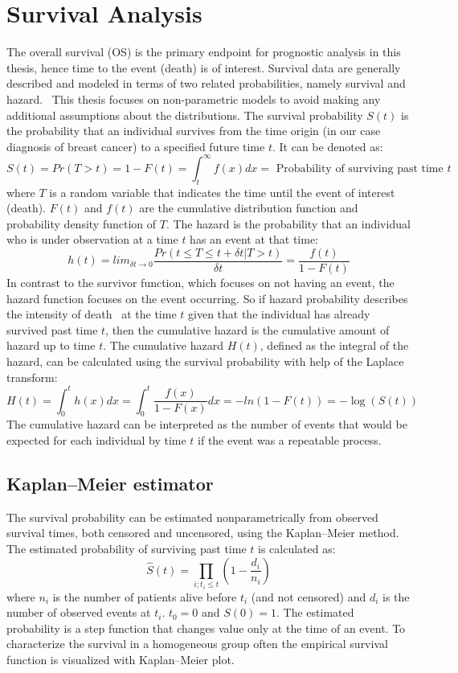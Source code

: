 \section{Survival Analysis}
The overall survival (OS) is the primary endpoint for prognostic analysis in this thesis,
hence time to the event (death) is of interest. 
Survival data are generally described and modeled in terms of two related probabilities, namely survival and hazard.~\cite{clark2003survival}
This thesis focuses on non-parametric models to avoid making any additional assumptions about the distributions.
The survival probability $S(t)$ is the probability that an individual survives from the time origin (in our case diagnosis of breast cancer) to a specified future time $t$.
It can be denoted as: $$S(t) = Pr(T>t) = 1-F(t) = \int_t^\infty f(x) dx = \textrm{ Probability of surviving past time } t $$
where $T$ is a random variable that indicates the time until the event of interest (death). $F(t)$ and $f(t)$ are the cumulative distribution function
and probability density function of $T$. 
The hazard is the probability that an individual who is under observation at a time $t$ has an event at that time:
$$h(t) = lim_{\delta t \rightarrow 0}\frac{Pr(t \leq T \leq t + \delta t | T > t)}{\delta t} = \frac{f(t)}{1-F(t)}$$
In contrast to the survivor function, which focuses on not having an event, the hazard function focuses on the event occurring. 
So if hazard probability describes the intensity of death~\cite{STAT_425} at the
time $t$ given that the individual has already survived past time $t$, then
the cumulative hazard is the cumulative amount of hazard up to time $t$.
The cumulative hazard $H(t)$, defined as the integral of the hazard,
can be calculated using the survival probability with help of the Laplace transform:
$$ H(t) = \int_0^t h(x) dx = \int_0^t \frac{f(x)}{1-F(x)} dx = - ln(1 - F(t)) = - \log (S(t)) $$
The cumulative hazard can be interpreted as the number of events that would be expected for each individual by time $t$ if the event was a repeatable process.~\cite{clark2003survival}

\subsection{Kaplan–Meier estimator}
The survival probability can be estimated nonparametrically from observed survival times,
both censored and uncensored, using the Kaplan–Meier method.
The estimated probability of surviving past time $t$ is calculated as:
$$\hat{S}(t) = \prod_{i; t_i \leq t} (1-\frac{d_i}{n_i})$$
where $n_i$ is the number of patients alive before $t_i$ (and not censored) and $d_i$ is the number of observed events at $t_i$. $t_0=0$ and $S(0)=1$.
The estimated probability is a step function that changes value only at the time of an event.
To characterize the survival in a homogeneous group often the empirical survival function is visualized with Kaplan–Meier plot.

